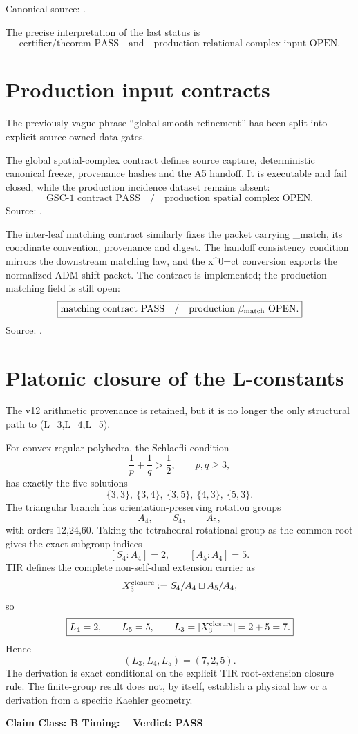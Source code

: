 \documentclass[11pt,a4paper,twoside]{book}
\def\({}%
\def\){}%
\theoremstyle{definition}
\newcommand{\vTwelveStatus}[3]{\par\noindent\textbf{Claim Class: #1 \quad Timing: #2 \quad Verdict: #3}\par}
\begin{document}
Canonical source:
.

The precise interpretation of the last status is
\[
\boxed{
\text{certifier/theorem PASS}
\quad\text{and}\quad
\text{production relational-complex input OPEN}.
}
\]

\section{Production input contracts}

The previously vague phrase ``global smooth refinement'' has been split into
explicit source-owned data gates.

The global spatial-complex contract defines source capture, deterministic
canonical freeze, provenance hashes and the A5 handoff.  It is executable and
fail closed, while the production incidence dataset remains absent:
\[
\boxed{
\text{GSC-1 contract PASS}
\quad/\quad
\text{production spatial complex OPEN}.
}
\]
Source:
.

The inter-leaf matching contract similarly fixes the packet carrying
\(\beta_{\rm match}\), its coordinate convention, provenance and digest.  The
handoff consistency condition mirrors the downstream matching law, and the
\(x^0=ct\) conversion exports the normalized ADM-shift packet.  The contract is
implemented; the production matching field is still open:
\[
\boxed{
\text{matching contract PASS}
\quad/\quad
\text{production }\beta_{\rm match}\text{ OPEN}.
}
\]
Source:
.

\section{Platonic closure of the L-constants}

The v12 arithmetic provenance is retained, but it is no longer the only
structural path to \((L_3,L_4,L_5)\).

For convex regular polyhedra, the Schlaefli condition
\[
\frac1p+\frac1q>\frac12,
\qquad p,q\ge3,
\]
has exactly the five solutions
\[
\{3,3\},\ \{3,4\},\ \{3,5\},\ \{4,3\},\ \{5,3\}.
\]
The triangular branch has orientation-preserving rotation groups
\[
A_4,\qquad S_4,\qquad A_5,
\]
with orders \(12,24,60\).  Taking the tetrahedral rotational group as the
common root gives the exact subgroup indices
\[
\boxed{[S_4:A_4]=2},
\qquad
\boxed{[A_5:A_4]=5}.
\]
TIR defines the complete non-self-dual extension carrier as
\[
X_3^{\rm closure}
:=S_4/A_4\sqcup A_5/A_4,
\]
so
\[
\boxed{
L_4=2,
\qquad L_5=5,
\qquad L_3=|X_3^{\rm closure}|=2+5=7.
}
\]
Hence
\[
\boxed{(L_3,L_4,L_5)=(7,2,5)}.
\]
The derivation is exact conditional on the explicit TIR root-extension closure
rule.  The finite-group result does not, by itself, establish a physical law or
a derivation from a specific Kaehler geometry.
\vTwelveStatus{B}{--}{PASS}
\end{document}
